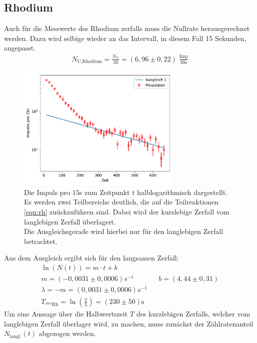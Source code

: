 \subsection{Rhodium}
Auch für die Messwerte des Rhodium zerfalls muss die Nullrate herausgerechnet werden.
Dazu wird selbige wieder an das Intervall, in diesem Fall 15 Sekunden, angepasst.
\begin{align*}
    N_{\text{U},\text{Rhodium}} =  \frac{N_{\text{U}}}{20} = (6,96 \pm 0,22) \; \frac{\text{Imp}}{30\text{s}}
\end{align*}
\begin{figure}
    \centering
    \includegraphics[width=0.7\textwidth]{plots/Rhodium_lang.pdf}
    \caption{Die Impuls pro $15$s zum Zeitpunkt $t$ halblogarithmisch dargestellt.\\
    Es werden zwei Teilbereiche deutlich, die auf die Teilreaktionen \ref{eqn:rh} zuückzuführen sind.
    Dabei wird der kurzlebige Zerfall vom langlebigen Zerfall überlagert.\\
    Die Ausgleichsgerade wird hierbei nur für den langlebigen Zerfall betrachtet.}
    \label{fig:langlebigRH}
\end{figure}
Aus dem Ausgleich ergibt sich für den langsamen Zerfall:
\begin{align*}
    \ln(N(t)) = m \cdot t + b\\
     m = (-0,0031 \pm 0,0006)\si{s^{-1}} && b = (4,44 \pm 0,31) \\
    \lambda = -m = (0,0031 \pm 0,0006)\si{s^{-1}} \\
    T_{^{104i}\text{Rh}} = \ln\left( \frac{2}{\lambda} \right) =  (230 \pm 50) \text{s}
\end{align*}
Um eine Aussage über die Halbwertszeit $T$ des kurzlebigen Zerfalls, welcher vom langlebigen Zerfall
überlager wird, zu machen, muss zunächst der Zählratenanteil $N_{\text{langl.}}(t)$ abgezogen werden.
